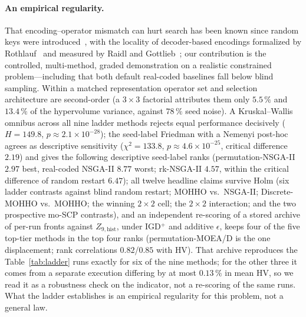 \documentclass[runningheads]{llncs}
\newcommand{\HV}{\textsf{HV}}
\newcommand{\IGD}{\textsf{IGD}}
\begin{document}
\paragraph{An empirical regularity.}
That encoding--operator mismatch can hurt search has been known since random keys were introduced~\cite{bean}, with the locality of decoder-based encodings formalized by Rothlauf~\cite{rothlauf} and measured by Raidl and Gottlieb~\cite{raidl}; our contribution is the controlled, multi-method, graded demonstration on a realistic constrained problem---including that both default real-coded baselines fall below blind sampling. Within a matched representation operator set and selection architecture are second-order (a $3\times3$ factorial attributes them only $5.5\,\%$ and $13.4\,\%$ of the hypervolume variance, against $78\,\%$ seed noise). A Kruskal--Wallis omnibus across all nine ladder methods rejects equal performance decisively ($H=149.8$, $p\approx2.1\times10^{-28}$); the seed-label Friedman with a Nemenyi post-hoc~\cite{demsar} agrees as descriptive sensitivity ($\chi^2=133.8$, $p\approx4.6\times10^{-25}$, critical difference $2.19$) and gives the following descriptive seed-label ranks (permutation-NSGA-II $2.97$ best, real-coded NSGA-II $8.77$ worst; rk-NSGA-II $4.57$, within the critical difference of random restart $6.47$); all twelve headline claims survive Holm (six ladder contrasts against blind random restart; MOHHO vs.\ NSGA-II; Discrete-MOHHO vs.\ MOHHO; the winning $2\times2$ cell; the $2\times2$ interaction; and the two prospective mo-SCP contrasts), and an independent re-scoring of a stored archive of per-run fronts against $Z_{9,\text{hist}}$, under \IGD$^{+}$ and additive $\epsilon$, keeps four of the five top-tier methods in the top four ranks (permutation-MOEA/D is the one displacement; rank correlations $0.82$/$0.85$ with \HV). That archive reproduces the Table~\ref{tab:ladder} runs exactly for six of the nine methods; for the other three it comes from a separate execution differing by at most $0.13\,\%$ in mean \HV, so we read it as a robustness check on the indicator, not a re-scoring of the same runs. What the ladder establishes is an empirical regularity for this problem, not a general law.
\end{document}
